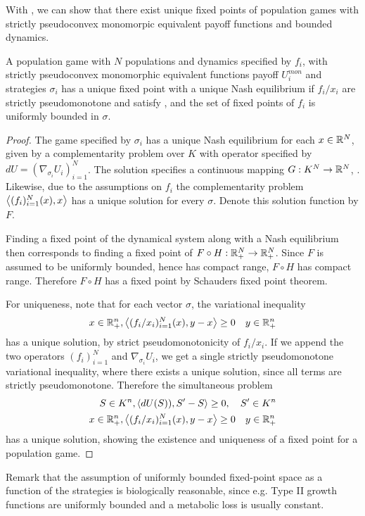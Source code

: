 With , we can show that there exist unique fixed points of population games with strictly pseudoconvex monomorpic equivalent payoff functions and bounded dynamics.
\begin{theorem}
  \label{thm:pop_game_exists_unique}
  A population game with $N$ populations and dynamics specified by $f_i$, with strictly pseudoconvex monomorphic equivalent functions payoff $U^{mon}_i$ and strategies $\sigma_i$ has a unique fixed point with a unique Nash equilibrium if $f_i/x_i$ are strictly pseudomonotone and satisfy , and the set of fixed points of $f_i$ is uniformly bounded in $\sigma$.
\end{theorem}
\begin{proof}
  The game specified by $\sigma_i$ has a unique Nash equilibrium for each $x\in \mathbb{R}^N$, given by a complementarity problem over $K$ with operator specified by $dU = (\nabla_{\sigma_i} U_i)_{i=1}^N$. The solution specifies a continuous mapping $G: K^N \to \mathbb{R}^N$, \cite[Theorem 4.2]{barbagallo2009continuity}. Likewise, due to the assumptions on $f_i$ the complementarity problem $\left \langle (f_i)_{i=1}^N(x),x \right \rangle$ has a unique solution for every $\sigma$. Denote this solution function by $F$.

  Finding a fixed point of the dynamical system along with a Nash equilibrium then corresponds to finding a fixed point of $F\circ H: \mathbb{R}_+^N \to \mathbb{R}_+^N$. Since $F$ is assumed to be uniformly bounded, hence has compact range, $F\circ H$ has compact range. Therefore $F\circ H$ has a fixed point by Schauders fixed point theorem.

  For uniqueness, note that for each vector $\sigma$, the variational inequality
  \begin{equation}
    x \in \mathbb{R}_+^n, \left \langle (f_i/x_i)_{i=1}^N(x),y-x \right \rangle\geq 0 \quad y\in \mathbb{R}_+^n
  \end{equation}
  has a unique solution, by strict pseudomonotonicity of $f_i/x_i$. If we append the two operators $(f_i)_{i=1}^N$ and $\nabla_{\sigma_i} U_i$, we get a single strictly pseudomonotone variational inequality, where there exists a unique solution, since all terms are strictly pseudomonotone.
 Therefore the simultaneous problem
\begin{equation}
  \begin{split}
  S\in K^n, \left \langle dU(S)),S'-S \right \rangle \geq 0, \quad S' \in K^n \\
  x \in \mathbb{R}_+^n, \left \langle (f_i/x_i)_{i=1}^N(x),y-x \right \rangle\geq 0 \quad y\in \mathbb{R}_+^n
\end{split}
\end{equation}
  has a unique solution, showing the existence and uniqueness of a fixed point for a population game.
\end{proof}
Remark that the assumption of uniformly bounded fixed-point space as a function of the strategies is biologically reasonable, since e.g. Type II growth functions are uniformly bounded and a metabolic loss is usually constant.

